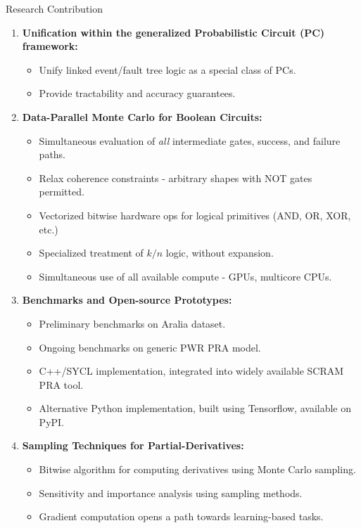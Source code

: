 

\begin{frame}[allowframebreaks]{Research Contribution}
\begin{enumerate}
\item \textbf{Unification within the generalized Probabilistic Circuit (PC) framework:}
  \begin{itemize}
    \item{Unify linked event/fault tree logic as a special class of PCs.}
    \item {Provide tractability and accuracy guarantees.}
  \end{itemize}
\vspace{16pt}
\item \textbf{Data-Parallel Monte Carlo for Boolean Circuits:}
  \begin{itemize}
    \item{Simultaneous evaluation of \emph{all} intermediate gates, success, and failure paths.}
    \item{Relax coherence constraints - arbitrary shapes with NOT gates permitted.}
    \item{Vectorized bitwise hardware ops for logical primitives (AND, OR, XOR, etc.)}
    \item{Specialized treatment of \(k/n\) logic, without expansion.}
    \item{Simultaneous use of all available compute - GPUs, multicore CPUs.}
    \vspace{16pt}
  \end{itemize}
\framebreak

\item \textbf{Benchmarks and Open-source Prototypes:}  
  \begin{itemize}
    \item{Preliminary benchmarks on Aralia dataset.}
    \item{Ongoing benchmarks on generic PWR PRA model.}
    \item{C++/SYCL implementation, integrated into widely available SCRAM PRA tool.}
    \item{Alternative Python implementation, built using Tensorflow, available on PyPI.}
\vspace{16pt}
  \end{itemize}


\item \textbf{Sampling Techniques for Partial-Derivatives:}  
  \begin{itemize}
    \item{Bitwise algorithm for computing derivatives using Monte Carlo sampling.}
    \item{Sensitivity and importance analysis using sampling methods.}
    \item{Gradient computation opens a path towards learning-based tasks.}
    \vspace{4pt}
  \end{itemize}
\end{enumerate}
\end{frame}
